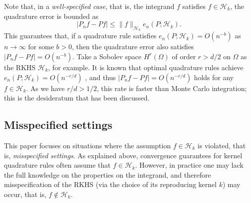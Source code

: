 \documentclass[11pt]{article}
\theoremstyle{remark}
\theoremstyle{example}
\theoremstyle{remark}
\renewcommand{\H}{{\mathcal{H}}}
\newcommand{\citep}{\cite}
\begin{document}
Note that, in a {\it well-specified case}, that is, the integrand $f$ satisfies $f\in\H_k$, the quadrature error is bounded as 
\[
\left| P_n f - P f \right| \leq \| f \|_{\H_k} e_n(P;\H_k).
\]
This guarantees that, if a quadrature rule satisfies $e_n(P; \H_k) = O(n^{-b})$ as $n \to \infty$ for some $b > 0$, then the quadrature error also satisfies $\left| P_n f - P f \right| = O(n^{-b})$.
Take a Sobolev space $H^r(\Omega)$ of order $r>d/2$ on $\Omega$ as the RKHS $\H_k$, for example.  It is known that optimal quadrature rules achieve $e_n(P;\H_k) =  O(n^{-r/d})$ \citep{Nov88}, and thus $\left| P_n f - P f \right| = O(n^{-r/d})$ holds for any $f\in \H_k$.
As we have $r/d > 1/2$, this rate is faster than Monte Carlo integration; this is the desideratum that has been discussed. 


\subsection{Misspecified settings}
This paper focuses on situations where the assumption $f \in \H_k$ is violated, that is, {\em misspecified settings}.
As explained above, convergence guarantees for kernel quadrature rules often assume that $f\in\H_k$.
However, in practice one may lack the full knowledge on the properties on the integrand, and therefore misspecification of the RKHS (via the choice of its reproducing kernel $k$) may occur, that is, $f \notin \H_k$.
\end{document}

